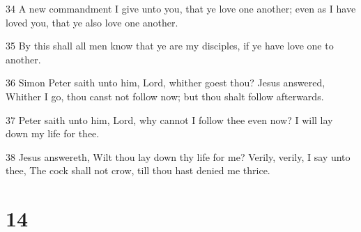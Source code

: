 \par 34 A new commandment I give unto you, that ye love one another; even as I have loved you, that ye also love one another.
\par 35 By this shall all men know that ye are my disciples, if ye have love one to another.
\par 36 Simon Peter saith unto him, Lord, whither goest thou? Jesus answered, Whither I go, thou canst not follow now; but thou shalt follow afterwards.
\par 37 Peter saith unto him, Lord, why cannot I follow thee even now? I will lay down my life for thee.
\par 38 Jesus answereth, Wilt thou lay down thy life for me? Verily, verily, I say unto thee, The cock shall not crow, till thou hast denied me thrice.

\chapter{14}


